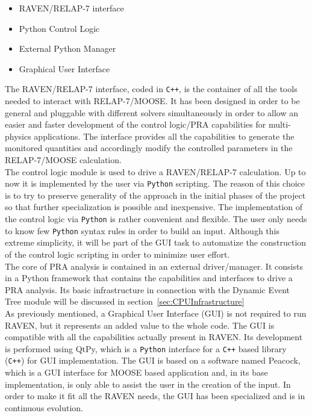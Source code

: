 \documentclass{mc2013}
\begin{document}
\vspace{-5mm}
\begin{itemize}
\itemsep0em
\item RAVEN/RELAP-7 interface
\item Python Control Logic 
\item External Python Manager
\item Graphical User Interface 
\end{itemize}
\vspace{-5mm}
The RAVEN/RELAP-7 interface, coded in \verb!C++!, is the container of all the tools needed to interact with RELAP-7/MOOSE. It has been designed in order to be general and pluggable with different solvers simultaneously in order to allow an easier and faster development of the control logic/PRA capabilities for multi-physics applications.
The interface provides all the capabilities to generate the monitored quantities and accordingly modify the controlled parameters in the RELAP-7/MOOSE calculation.
\\The control logic module is used to drive a RAVEN/RELAP-7 calculation. Up to now it is implemented by the user via \verb!Python! scripting. The reason of this choice is to try to preserve generality of the approach in the initial phases of the project so that further specialization is possible and  inexpensive. The implementation of the control logic via \verb!Python! is rather convenient and flexible. The user only needs to know few \verb!Python! syntax rules in order to build an input. Although this extreme simplicity, it will be part of the GUI task to automatize the construction of the control logic scripting in order to minimize user effort. 
\\The core of PRA analysis is contained in an external driver/manager. It consists in a Python framework that contains the capabilities and interfaces to drive a PRA analysis. Its basic infrastructure in connection with the Dynamic Event Tree module will be discussed in section~\ref{sec:CPUInfrastructure}   
\\As previously mentioned, a Graphical User Interface (GUI) is not required to run RAVEN, but it represents an added value to the whole code. The GUI is compatible with all the capabilities actually present in RAVEN.  Its development is performed using QtPy, which is a \verb!Python! interface for a \verb!C++! based library (\verb!C++!) for GUI implementation. The GUI is based on a software named Peacock, which is a GUI interface for MOOSE based application and, in its base implementation, is only able to assist the user in the creation of the input.  In order to make it fit all the RAVEN needs, the GUI has been specialized and is in continuous evolution.
\end{document}
